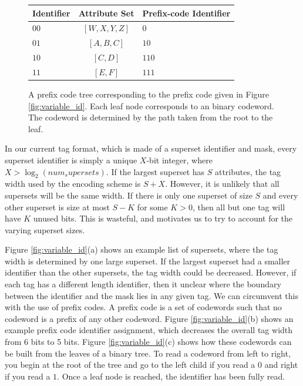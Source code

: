 \begin{figure}[t!] 
\begin{minipage}{1\linewidth}
	\begin{tabular}{| p{1.5cm} | c | p{2cm} |}
    \hline
    Identifier & Attribute Set & Prefix-code Identifier\\ \hline
    $00$ & $[W,X,Y,Z]$ & $0$ \\ \hline
    $01$ & $[A,B,C]$ & $10$ \\ \hline
    $10$ & $[C,D]$ & $110$ \\ \hline
    $11$ & $[E,F]$ & $111$ \\
    \hline
    \end{tabular}
\end{minipage} 
\caption{A prefix code tree corresponding to the prefix code given in Figure \ref{fig:variable_id}. Each leaf node corresponds to an binary codeword. The codeword is determined by the path taken from the root to the leaf. }
\label{fig:code_tree}
\end{figure}

In our current tag format, which is made of a superset identifier and mask, every superset identifier is simply a unique $X$-bit integer, where $X > \log_2(num_supersets)$. If the largest superset has $S$ attributes, the tag width used by the encoding scheme is $S + X$. However, it is unlikely that all supersets will be the same width. If there is only one superset of size $S$ and every other superset is size at most $S-K$ for some $K > 0$, then all but one tag will have $K$ unused bits. This is wasteful, and motivates us to try to account for the varying superset sizes. 


Figure \ref{fig:variable_id}(a) shows an example list of supersets, where the tag width is determined by one large superset. If the largest superset had a smaller identifier than the other supersets, the tag width could be decreased. However, if each tag has a different length identifier, then it unclear where the boundary between the identifier and the mask lies in any given tag. We can circumvent this with the use of prefix codes. A prefix code is a set of codewords such that no codeword is a prefix of any other codeword. Figure \ref{fig:variable_id}(b) shows an example prefix code identifier assignment, which decreases the overall tag width from 6 bits to 5 bits. Figure \ref{fig:variable_id}(c) shows how these codewords can be built from the leaves of a binary tree. To read a codeword from left to right, you begin at the root of the tree and go to the left child if you read a $0$ and right if you read a $1$. Once a leaf node is reached, the identifier has been fully read.

